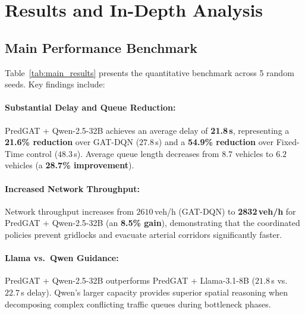 \documentclass[11pt,a4paper]{article}
\begin{document}
\section{Results and In-Depth Analysis}
\label{sec:results}

\subsection{Main Performance Benchmark}
Table~\ref{tab:main_results} presents the quantitative benchmark across 5 random seeds. Key findings include:

\paragraph{Substantial Delay and Queue Reduction:} PredGAT + Qwen-2.5-32B achieves an average delay of \textbf{21.8\,s}, representing a \textbf{21.6\% reduction} over GAT-DQN ($27.8$\,s) and a \textbf{54.9\% reduction} over Fixed-Time control ($48.3$\,s). Average queue length decreases from $8.7$ vehicles to $6.2$ vehicles (a \textbf{28.7\% improvement}).

\paragraph{Increased Network Throughput:} Network throughput increases from $2610$\,veh/h (GAT-DQN) to \textbf{2832\,veh/h} for PredGAT + Qwen-2.5-32B (an \textbf{8.5\% gain}), demonstrating that the coordinated policies prevent gridlocks and evacuate arterial corridors significantly faster.

\paragraph{Llama vs.\ Qwen Guidance:} PredGAT + Qwen-2.5-32B outperforms PredGAT + Llama-3.1-8B ($21.8$\,s vs.\ $22.7$\,s delay). Qwen's larger capacity provides superior spatial reasoning when decomposing complex conflicting traffic queues during bottleneck phases.
\end{document}
